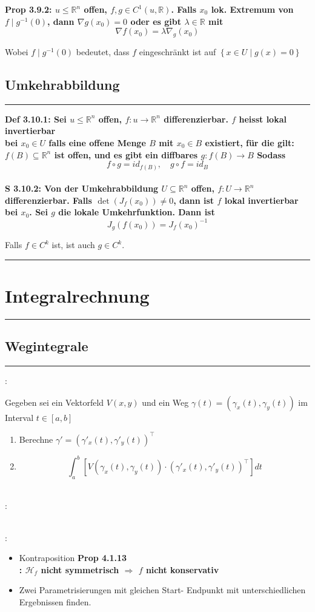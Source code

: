 \documentclass[7pt,landscape, margin = 0.1mm]{article}
\newcommand{\titellinie}{\rule{1.\linewidth}{0.75pt}}
\newcommand*{\mysection}[2][black]{\vskip 0pt \titellinie\vspace{-20pt}\section{#2}\vspace{-14pt}\titellinie \colorlet{chaptercolor}{#1}}
\newcommand*{\mysubsection}[1]{\vspace{-2mm}\color{chaptercolor}\subsection{ #1 }
\vspace{-1mm}\hrule\vspace{1.5mm}\color{black}
\vspace{2mm}}
\newcommand{\COL}[1]{ \color{chaptercolor} \bf{#1}\color{black}     \\}
\newcommand{\KRZ}[2]{\vspace{1mm} \hline \vspace{1mm} \color{chaptercolor}{RC #1}:\color{black} \   \hspace{0.2cm}\vspace{1mm}   {\begin{minipage}{20em}
#2 \end{minipage}} \vspace{1mm}  \hline \vspace{1mm}  \\}
\newcommand{\DEF}[2]{\color{chaptercolor}\bf{Def #1}:\color{black}    \hspace{0.2cm} #2 \\}
\newcommand{\PROP}[2]{\color{chaptercolor}\bf{Prop #1}:\color{black}    \hspace{0.2cm} #2 \\}
\newcommand{\SA}[2]{\color{chaptercolor}\bf{S #1}:\color{black}    \hspace{0.2cm} #2 \\}
\begin{document}
\begin{multicols}{4}
\begin{flushleft}
{}

\PROP{3.9.2}{$u \leq \mathbb{R}^n$ offen, $f, g \in C^1(u, \mathbb{R})$. Falls $x_0$ lok. Extremum von $f \mid{g^{-1}(0)}$, dann $\nabla g\left(x_0\right)=0$ oder es gibt $\lambda \in \mathbb{R}$ mit $$\nabla f\left(x_0\right)=\lambda \nabla_g\left(x_0\right)$$

Wobei $f \mid{g^{-1}(0)}$ bedeutet, dass $f$ eingeschränkt ist auf $\left\{ x \in U \mid g(x)=0\right\}$}

\mysubsection{Umkehrabbildung}

\DEF{3.10.1}{ Sei $u \leq \mathbb{R}^n$ offen, $f: u \rightarrow \mathbb{R}^n$ differenzierbar. 
 $f$ heisst \COL{lokal invertierbar}  bei $x_0 \in U$ falls eine offene Menge $B$ mit $x_0 \in B$ existiert, für die gilt: $f(B) \subseteq \mathbb{R}^n$ ist offen, und es gibt ein diffbares $g: f(B) \rightarrow B$ Sodass $$f \circ g=id_{f(B)}, \quad g \circ f=i d_B$$}
 
 
 \SA{3.10.2}{Von der Umkehrabbildung $U \subseteq \mathbb{R}^n$ offen, $f: U \rightarrow \mathbb{R}^{n}$ differenzierbar. 
Falls $\operatorname{det}\left(J_f\left(x_0\right)\right) \neq 0$, dann ist $f$ lokal invertierbar bei $x_0$.
  Sei $g$ die lokale Umkehrfunktion. Dann ist
 $$
 J_g\left(f\left(x_0\right)\right)=J_f\left(x_0\right)^{-1}
 $$
 
 Falls $f\in  C^k$ ist, ist auch $g \in C^k$.}
 
 
\mysection[orange]{\centering Integralrechnung}




\mysubsection{Wegintegrale}

\KRZ{Wegintegrale}{
Gegeben sei ein Vektorfeld $V(x,y)$ und ein Weg $\gamma(t) = (\gamma_x(t) , \gamma_y(t))$ im Interval $t\in[a,b]$
\begin{enumerate}
\item Berechne $\gamma\prime =  (\gamma\prime_x(t) , \gamma\prime_y(t))^\top $
\item $$\int_a^b \left[ V(\gamma_x(t) ,\gamma_y(t)) \cdot (\gamma\prime_x(t) , \gamma\prime_y(t))^\top \right] dt $$
\end{enumerate}

}

\KRZ{Umparametrisierung}{


}


\KRZ{Konservativität widerlegen}{
\begin{itemize}
\item Kontraposition \COL{Prop 4.1.13}: $\mathcal{H}_f$ nicht symmetrisch $\Rightarrow$ $f$ nicht konservativ
 \item Zwei Parametrisierungen mit gleichen Start- Endpunkt mit unterschiedlichen Ergebnissen finden.
\end{itemize}
}


\end{flushleft}
\end{multicols}
\end{document}
